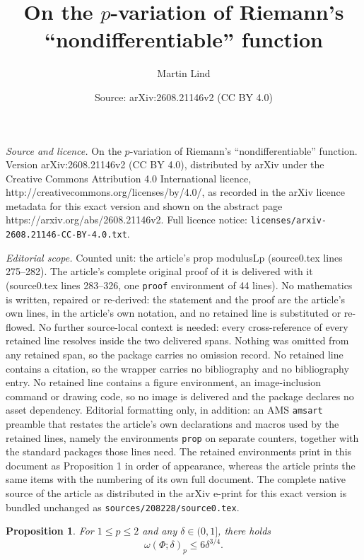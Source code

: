\documentclass[10pt,a4paper]{amsart}
\title{On the $p$-variation of Riemann's ``nondifferentiable'' function}
\author{Martin Lind}
\date{Source: arXiv:2608.21146v2 (CC BY 4.0)}
\newtheorem{prop}{Proposition}
\begin{document}
\maketitle

\noindent\emph{Source and licence.} On the $p$-variation of Riemann's ``nondifferentiable'' function. Version arXiv:2608.21146v2 (CC BY 4.0), distributed by arXiv under the Creative Commons Attribution 4.0 International licence, http://creativecommons.org/licenses/by/4.0/, as recorded in the arXiv licence metadata for this exact version and shown on the abstract page https://arxiv.org/abs/2608.21146v2. Full licence notice: \texttt{licenses/arxiv-2608.21146-CC-BY-4.0.txt}.\par\smallskip

\noindent\textit{Editorial scope.} Counted unit: the article's prop modulusLp (source0.tex lines 275--282). The article's complete original proof of it is delivered with it (source0.tex lines 283--326, one \texttt{proof} environment of 44 lines). No mathematics is written, repaired or re-derived: the statement and the proof are the article's own lines, in the article's own notation, and no retained line is substituted or re-flowed.  No further source-local context is needed: every cross-reference of every retained line resolves inside the two delivered spans.  Nothing was omitted from any retained span, so the package carries no omission record.  No retained line contains a citation, so the wrapper carries no bibliography and no bibliography entry.  No retained line contains a figure environment, an image-inclusion command or drawing code, so no image is delivered and the package declares no asset dependency.  Editorial formatting only, in addition: an AMS \texttt{amsart} preamble that restates the article's own declarations and macros used by the retained lines, namely the environments \texttt{prop} on separate counters, together with the standard packages those lines need.  The retained environments print in this document as Proposition 1 in order of appearance, whereas the article prints the same items with the numbering of its own full document.  The complete native source of the article as distributed in the arXiv e-print for this exact version is bundled unchanged as \texttt{sources/208228/source0.tex}.
\begin{prop}
    \label{modulusLp}
    For $1\le p\le2$ and any $\delta\in(0,1]$, there holds
    \begin{equation}
        \label{modulusIneq}
        \omega(\Phi;\delta)_p\le 6\delta^{3/4}.
    \end{equation}
\end{prop}
\end{document}
